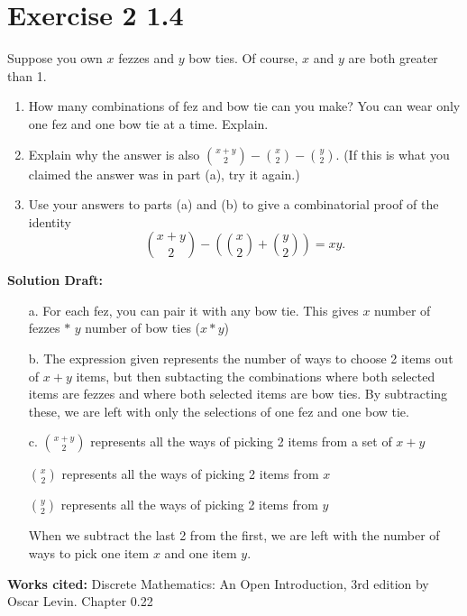 \documentclass{article}
\begin{document}
\section*{Exercise 2 1.4}  


Suppose you own \( x \) fezzes and \( y \) bow ties. Of course, \( x \) and \( y \) are both greater than 1.
\begin{enumerate}
    \item How many combinations of fez and bow tie can you make? You can wear only one fez and one bow tie at a time. Explain.
    \item Explain why the answer is also \( \binom{x+y}{2} - \binom{x}{2} - \binom{y}{2} \). (If this is what you claimed the answer was in part (a), try it again.)
    \item Use your answers to parts (a) and (b) to give a combinatorial proof of the identity
    \[
    \binom{x + y}{2} - \left( \binom{x}{2} + \binom{y}{2} \right) = xy .
    \]
\end{enumerate}

\vspace{0.5cm}
\noindent\textbf{Solution Draft:} 
\vspace{0.2cm}

\begin{enumerate}
    \item[a.] For each fez, you can pair it with any bow tie. This gives $x$ number of fezzes $*$ $y$ number of bow ties ($x*y$)
    \item[b.] The expression given represents the number of ways to choose 2 items out of $x+y$ items, but then subtacting the combinations where both selected items are fezzes and where both selected items are bow ties. By subtracting these, we are left with only the selections of one fez and one bow tie.
    \item[c.] 
    $\binom{x + y}{2}$ represents all the ways of picking 2 items from a set of $x+y$

    $\binom{x}{2}$ represents all the ways of picking 2 items from $x$

    $\binom{y}{2}$ represents all the ways of picking 2 items from $y$

    When we subtract the last 2 from the first, we are left with the number of ways to pick one item $x$ and one item $y$.
    \end{enumerate}
    \vspace{0.5cm}
    \textbf{Works cited:}
    Discrete Mathematics: An Open Introduction, 3rd edition by Oscar Levin. Chapter 0.22
\end{document}
